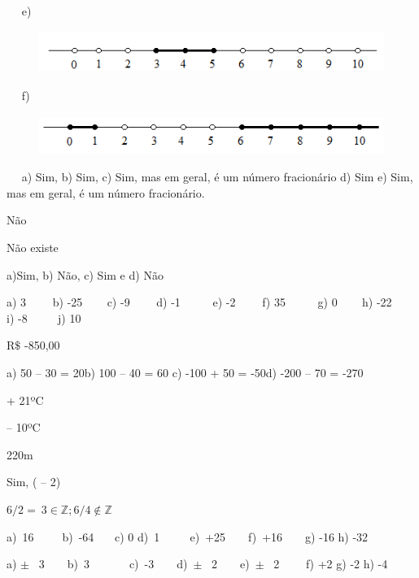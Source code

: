 \begin{respostas}{2}
\begin{figure}[H]
\end{figure}
~~
e)
\begin{figure}[H]
	\begin{Center}
		\includegraphics[width=4.94in,height=0.54in]{capitulos/conjuntos_numericos/media/image15.png}
	\end{Center}
\end{figure}
~~
f)
\begin{figure}[H]
	\begin{Center}
		\includegraphics[width=4.83in,height=0.5in]{capitulos/conjuntos_numericos/media/image16.png}
	\end{Center}
\end{figure}
~~
	\ansitem{} a) Sim, b) Sim, c) Sim, mas em geral, é um número fracionário d) Sim e) Sim, mas em geral, é um número fracionário.

    \ansitem{} Não

	\ansitem{} Não existe

	\ansitem{} a)Sim, b) Não, c) Sim e d) Não

\end{respostas}

\begin{respostas}{3}
	\ansitem{} a) 3~~~~ b) -25~~ ~ c) -9~~~~ d) -1~~~~~ e) -2~~~~ f) 35~~~~~ g) 0~~ ~ h) -22~ ~  i) -8 ~~~~ j) 10

	\ansitem{} R$\$$  -850,00

	\ansitem{} a) 50 – 30 = 20\quad b) 100 – 40 = 60  \quad c) -100 + 50 = -50\quad d) -200 – 70 = -270

	\ansitem{} + 21ºC

	\ansitem{} – 10ºC 

	\ansitem{} 220m

	\ansitem{} Sim, ( – 2)

	\ansitem{} \( 6/2=~3   \in \mathbb{Z};6/4 \notin  \mathbb{Z} \)  


\ansitem{} a)~16~~~~~b)~-64~~~ c) 0     d)~1~~  ~~ e)~+25~~~~f)~+16~~~~g) -16     h) -32

\ansitem{}a) $ \pm $ ~3~~~~b)~3~~~~~~~c)~-3~~~~d)~$ \pm $ ~2~~~~e)~$ \pm $ ~2~~~~ f) +2      g) -2       h) -4
\end{respostas}

